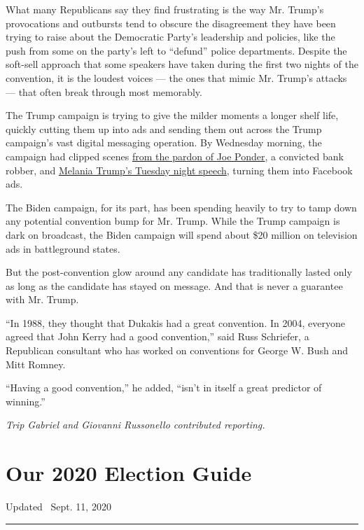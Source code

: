 What many Republicans say they find frustrating is the way Mr. Trump's
provocations and outbursts tend to obscure the disagreement they have
been trying to raise about the Democratic Party's leadership and
policies, like the push from some on the party's left to ``defund''
police departments. Despite the soft-sell approach that some speakers
have taken during the first two nights of the convention, it is the
loudest voices --- the ones that mimic Mr. Trump's attacks --- that
often break through most memorably.

The Trump campaign is trying to give the milder moments a longer shelf
life, quickly cutting them up into ads and sending them out across the
Trump campaign's vast digital messaging operation. By Wednesday morning,
the campaign had clipped scenes
\href{https://www.facebookcorewwwi.onion/ads/library/?id=611652599723644}{from
the pardon of Joe Ponder}, a convicted bank robber, and
\href{https://www.facebookcorewwwi.onion/ads/library/?id=975219909621168}{Melania
Trump's Tuesday night speech}, turning them into Facebook ads.

The Biden campaign, for its part, has been spending heavily to try to
tamp down any potential convention bump for Mr. Trump. While the Trump
campaign is dark on broadcast, the Biden campaign will spend about \$20
million on television ads in battleground states.

But the post-convention glow around any candidate has traditionally
lasted only as long as the candidate has stayed on message. And that is
never a guarantee with Mr. Trump.

``In 1988, they thought that Dukakis had a great convention. In 2004,
everyone agreed that John Kerry had a good convention,'' said Russ
Schriefer, a Republican consultant who has worked on conventions for
George W. Bush and Mitt Romney.

``Having a good convention,'' he added, ``isn't in itself a great
predictor of winning.''

\emph{Trip Gabriel and Giovanni Russonello contributed reporting.}

\hypertarget{our-2020-election-guide}{%
\section{Our 2020 Election Guide}\label{our-2020-election-guide}}

Updated ~Sept. 11, 2020

\begin{center}\rule{0.5\linewidth}{\linethickness}\end{center}

